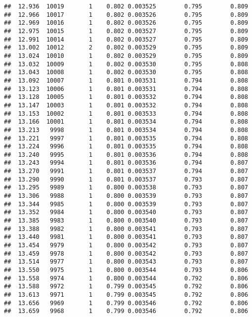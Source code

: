 \documentclass[
]{book}
\begin{document}
\begin{verbatim}
##  12.936  10019       1    0.802 0.003525        0.795        0.809
##  12.966  10017       1    0.802 0.003526        0.795        0.809
##  12.969  10016       1    0.802 0.003526        0.795        0.809
##  12.975  10015       1    0.802 0.003527        0.795        0.809
##  12.991  10014       1    0.802 0.003527        0.795        0.809
##  13.002  10012       2    0.802 0.003529        0.795        0.809
##  13.024  10010       1    0.802 0.003529        0.795        0.809
##  13.032  10009       1    0.802 0.003530        0.795        0.808
##  13.043  10008       1    0.802 0.003530        0.795        0.808
##  13.092  10007       1    0.801 0.003531        0.794        0.808
##  13.123  10006       1    0.801 0.003531        0.794        0.808
##  13.128  10005       1    0.801 0.003532        0.794        0.808
##  13.147  10003       1    0.801 0.003532        0.794        0.808
##  13.153  10002       1    0.801 0.003533        0.794        0.808
##  13.166  10001       1    0.801 0.003534        0.794        0.808
##  13.213   9998       1    0.801 0.003534        0.794        0.808
##  13.221   9997       1    0.801 0.003535        0.794        0.808
##  13.224   9996       1    0.801 0.003535        0.794        0.808
##  13.240   9995       1    0.801 0.003536        0.794        0.808
##  13.243   9994       1    0.801 0.003536        0.794        0.807
##  13.270   9991       1    0.801 0.003537        0.794        0.807
##  13.290   9990       1    0.801 0.003537        0.793        0.807
##  13.295   9989       1    0.800 0.003538        0.793        0.807
##  13.306   9988       1    0.800 0.003539        0.793        0.807
##  13.344   9985       1    0.800 0.003539        0.793        0.807
##  13.352   9984       1    0.800 0.003540        0.793        0.807
##  13.385   9983       1    0.800 0.003540        0.793        0.807
##  13.388   9982       1    0.800 0.003541        0.793        0.807
##  13.440   9981       1    0.800 0.003541        0.793        0.807
##  13.454   9979       1    0.800 0.003542        0.793        0.807
##  13.459   9978       1    0.800 0.003542        0.793        0.807
##  13.514   9977       1    0.800 0.003543        0.793        0.807
##  13.550   9975       1    0.800 0.003544        0.793        0.806
##  13.558   9974       1    0.800 0.003544        0.792        0.806
##  13.588   9972       1    0.799 0.003545        0.792        0.806
##  13.613   9971       1    0.799 0.003545        0.792        0.806
##  13.656   9969       1    0.799 0.003546        0.792        0.806
##  13.659   9968       1    0.799 0.003546        0.792        0.806

\end{verbatim}
\end{document}
